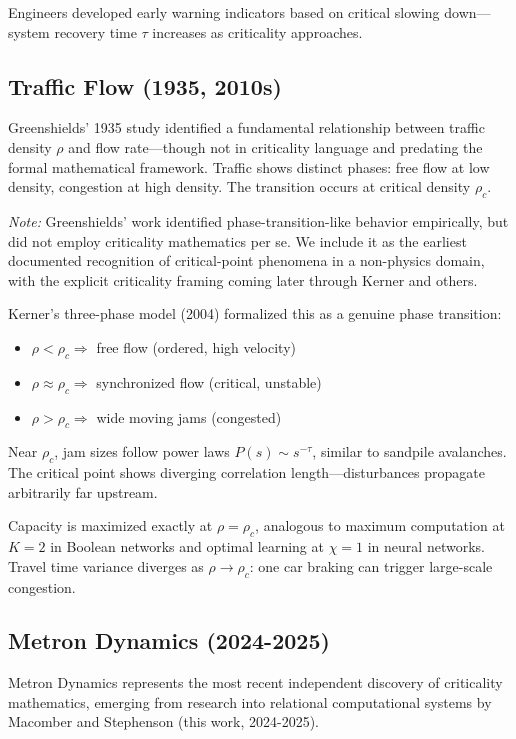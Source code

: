 \documentclass[11pt]{article}
\begin{document}
Engineers developed early warning indicators based on critical slowing down---system recovery time $\tau$ increases as criticality approaches.

\subsection{Traffic Flow (1935, 2010s)}

Greenshields' 1935 study \cite{greenshields1935} identified a fundamental relationship between traffic density $\rho$ and flow rate---though not in criticality language and predating the formal mathematical framework. Traffic shows distinct phases: free flow at low density, congestion at high density. The transition occurs at critical density $\rho_c$.

\textit{Note:} Greenshields' work identified phase-transition-like behavior empirically, but did not employ criticality mathematics per se. We include it as the earliest documented recognition of critical-point phenomena in a non-physics domain, with the explicit criticality framing coming later through Kerner and others.

Kerner's three-phase model (2004) \cite{kerner2004} formalized this as a genuine phase transition:
\begin{itemize}[nosep]
    \item $\rho < \rho_c \Longrightarrow$ free flow (ordered, high velocity)
    \item $\rho \approx \rho_c \Longrightarrow$ synchronized flow (critical, unstable)
    \item $\rho > \rho_c \Longrightarrow$ wide moving jams (congested)
\end{itemize}

Near $\rho_c$, jam sizes follow power laws $P(s) \sim s^{-\tau}$, similar to sandpile avalanches. The critical point shows diverging correlation length---disturbances propagate arbitrarily far upstream.

Capacity is maximized exactly at $\rho = \rho_c$, analogous to maximum computation at $K = 2$ in Boolean networks and optimal learning at $\chi = 1$ in neural networks. Travel time variance diverges as $\rho \to \rho_c$: one car braking can trigger large-scale congestion.

\subsection{Metron Dynamics (2024-2025)}

Metron Dynamics represents the most recent independent discovery of criticality mathematics, emerging from research into relational computational systems by Macomber and Stephenson (this work, 2024-2025).
\end{document}
